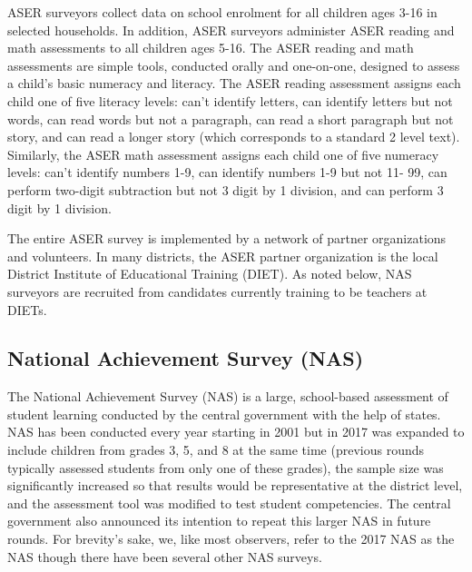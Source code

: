 \documentclass[
  11pt,
]{article}
\begin{document}
ASER surveyors collect data on school enrolment for all children ages 3-16 in selected households. In addition, ASER surveyors administer ASER reading and math assessments to all children ages 5-16. The ASER reading and math assessments are simple tools, conducted orally and one-on-one, designed to assess a child's basic numeracy and literacy. The ASER reading assessment assigns each child one of five literacy levels: can't identify letters, can identify letters but not words, can read words but not a paragraph, can read a short paragraph but not story, and can read a longer story (which corresponds to a standard 2 level text). Similarly, the ASER math assessment assigns each child one of five numeracy levels: can't identify numbers 1-9, can identify numbers 1-9 but not 11- 99, can perform two-digit subtraction but not 3 digit by 1 division, and can perform 3 digit by 1 division.

The entire ASER survey is implemented by a network of partner organizations and volunteers. In many districts, the ASER partner organization is the local District Institute of Educational Training (DIET). As noted below, NAS surveyors are recruited from candidates currently training to be teachers at DIETs.

\hypertarget{national-achievement-survey-nas}{%
\subsection{National Achievement Survey (NAS)}\label{national-achievement-survey-nas}}

The National Achievement Survey (NAS) is a large, school-based assessment of student learning conducted by the central government with the help of states. NAS has been conducted every year starting in 2001 but in 2017 was expanded to include children from grades 3, 5, and 8 at the same time (previous rounds typically assessed students from only one of these grades), the sample size was significantly increased so that results would be representative at the district level, and the assessment tool was modified to test student competencies. The central government also announced its intention to repeat this larger NAS in future rounds. For brevity's sake, we, like most observers, refer to the 2017 NAS as the NAS though there have been several other NAS surveys.
\end{document}
